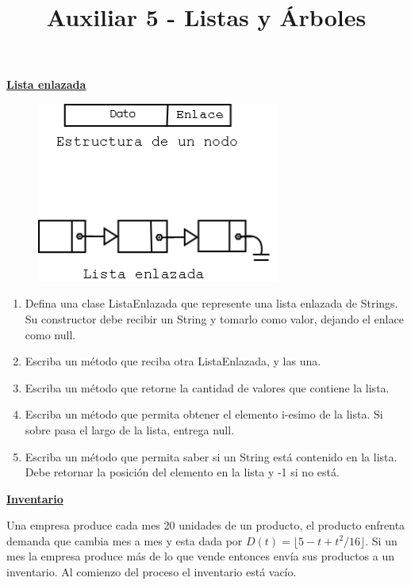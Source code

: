 \documentclass[dcc,uchile,sol]{fcfmcourse}
\title{Auxiliar 5 - Listas y Árboles}
\newcommand{\ptitle}[1]{\underline{\textbf{#1}}}
\begin{document}
\maketitle

\vspace{-1ex}


\begin{problems}
\problem \ptitle{Lista enlazada}
\newline

\begin{figure}[h]
    \centering
    \includegraphics[width=8cm]{imagenes/lista.png}
\end{figure}

\begin{enumerate}
    \item Defina una clase ListaEnlazada que represente una lista enlazada de Strings. Su constructor debe recibir un String y tomarlo como valor, dejando el enlace como null.
        
    \item Escriba un método que reciba otra ListaEnlazada, y las una.
    
    \item Escriba un método que retorne la cantidad de valores que contiene la lista.
    
    \item Escriba un método que permita obtener el elemento i-esimo de la lista. Si sobre pasa el largo de la lista, entrega null.
    
    \item Escriba un método que permita saber si un String está contenido en la lista. Debe retornar la posición del elemento en la lista y -1 si no está.
    

\end{enumerate}

\problem \ptitle{Inventario}

Una empresa produce cada mes 20 unidades de un producto, el producto enfrenta demanda que cambia mes a mes y esta dada por $D(t) = \lfloor 5 - t + t^2/16 \rfloor$. Si un mes la empresa produce más de lo que vende entonces envía sus productos a un inventario. Al comienzo del proceso el inventario está vacío.


\end{problems}
\end{document}
